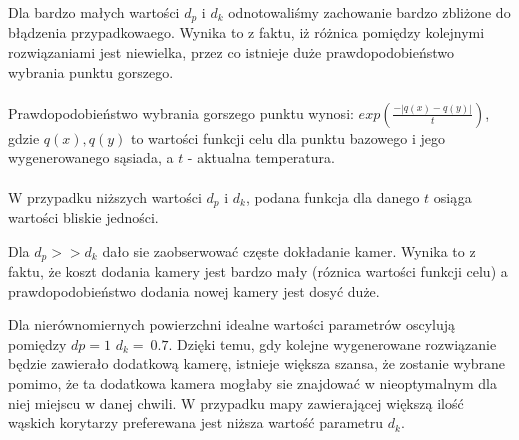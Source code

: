 \documentclass[12pt,a4paper]{article}
\begin{document}
Dla bardzo małych wartości $d_p$ i $d_k$ odnotowaliśmy zachowanie
bardzo zbliżone do błądzenia przypadkowaego.
Wynika to z faktu, iż różnica pomiędzy kolejnymi rozwiązaniami jest niewielka,
przez co istnieje duże prawdopodobieństwo wybrania punktu gorszego.\\ \\
Prawdopodobieństwo wybrania gorszego punktu wynosi:
$exp(\frac{-|q(x)-q(y)|}{t})$,\\
gdzie $q(x), q(y)$ to wartości funkcji celu dla punktu
bazowego i jego wygenerowanego sąsiada, a $t$ - aktualna temperatura. \\ \\
W przypadku niższych wartości $d_p$ i $d_k$, podana funkcja dla danego $t$
osiąga wartości bliskie jedności. \\

\begin{figure}[H]
\begin{floatrow}
       }
       \ffigbox[\FBwidth]{\caption{SlimMap,
       \newline $d_p=1$, $d_k=0.1$, $skala=5$}\label{fig-10}}{%
         \texttt{[image: \{slimMap\_1\_0.1\_5]}.png}
       }
       \end{floatrow}
\end{figure}

Dla $d_p >> d_k$ dało sie zaobserwować częste dokładanie kamer.
Wynika to z faktu, że koszt dodania kamery jest bardzo mały
(róznica wartości funkcji celu) a prawdopodobieństwo
dodania nowej kamery jest dosyć duże. \\

\begin{figure}[H]
\begin{floatrow}
       }
       \ffigbox[\FBwidth]{\caption{SlimMap,
       $d_p=1$, $d_k=0.4$, $skala=5$}\label{fig-12}}{%
         \texttt{[image: \{slimMap\_1\_0.4\_5]}.png}
       }
       \end{floatrow}
\end{figure}
Dla nierównomiernych powierzchni idealne wartości parametrów oscylują pomiędzy
$dp=1$ $d_k=~0.7$.
Dzięki temu, gdy kolejne wygenerowane rozwiązanie będzie zawierało
dodatkową kamerę, istnieje większa szansa, że zostanie wybrane pomimo,
że ta dodatkowa kamera mogłaby sie znajdować w nieoptymalnym
dla niej miejscu w danej chwili.
W przypadku mapy zawierającej większą ilość wąskich korytarzy preferewana
jest niższa wartość parametru $d_k$.
\end{document}
